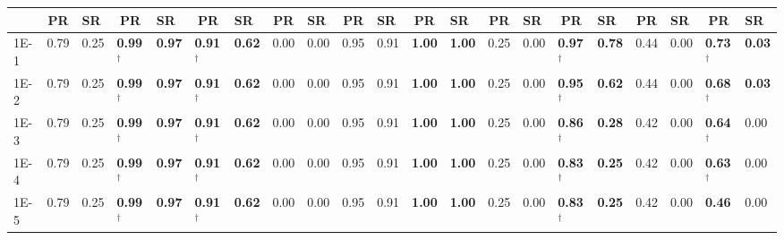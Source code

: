 \begin{table*}[h]
{\begin{tabular}{|p{4.8mm}|p{4.6mm}|p{4.6mm}|p{4.6mm}|p{4.6mm}|p{4.6mm}|p{4.6mm}|p{4.6mm}|p{4.6mm}|p{4.6mm}|p{4.6mm}|p{4.6mm}|p{4.6mm}|p{4.6mm}|p{4.6mm}|p{4.6mm}|p{4.6mm}|p{4.6mm}|p{4.6mm}|p{4.6mm}|p{4.6mm}|}
    \cline{2-21}
     & \multicolumn{1}{c|}{PR} & SR & \multicolumn{1}{c|}{PR} & SR & \multicolumn{1}{c|}{PR} & SR & \multicolumn{1}{c|}{PR} & SR & \multicolumn{1}{c|}{PR} & SR & \multicolumn{1}{c|}{PR} & SR & \multicolumn{1}{c|}{PR} & SR & \multicolumn{1}{c|}{PR} & SR & \multicolumn{1}{c|}{PR} & SR & \multicolumn{1}{c|}{PR} & SR \\
    \hline
    1E-1 & 0.79 & 0.25 & \textcolor{customblue}{\textbf{0.99$^\dagger$}} & \textcolor{customblue}{\textbf{0.97}} & \textcolor{customred}{\textbf{0.91$^\dagger$}} & \textcolor{customred}{\textbf{0.62}} & 0.00 & 0.00 & 0.95 & 0.91 & \textcolor{customblue}{\textbf{1.00}} & \textcolor{customblue}{\textbf{1.00}} & 0.25 & 0.00 & \textcolor{customblue}{\textbf{0.97$^\dagger$}} & \textcolor{customblue}{\textbf{0.78}} & 0.44 & 0.00 & \textcolor{customblue}{\textbf{0.73$^\dagger$}} & \textcolor{customblue}{\textbf{0.03}} \\
    1E-2 & 0.79 & 0.25 & \textcolor{customblue}{\textbf{0.99$^\dagger$}} & \textcolor{customblue}{\textbf{0.97}} & \textcolor{customred}{\textbf{0.91$^\dagger$}} & \textcolor{customred}{\textbf{0.62}} & 0.00 & 0.00 & 0.95 & 0.91 & \textcolor{customblue}{\textbf{1.00}} & \textcolor{customblue}{\textbf{1.00}} & 0.25 & 0.00 & \textcolor{customblue}{\textbf{0.95$^\dagger$}} & \textcolor{customblue}{\textbf{0.62}} & 0.44 & 0.00 & \textcolor{customblue}{\textbf{0.68$^\dagger$}} & \textcolor{customblue}{\textbf{0.03}} \\
    1E-3 & 0.79 & 0.25 & \textcolor{customblue}{\textbf{0.99$^\dagger$}} & \textcolor{customblue}{\textbf{0.97}} & \textcolor{customred}{\textbf{0.91$^\dagger$}} & \textcolor{customred}{\textbf{0.62}} & 0.00 & 0.00 & 0.95 & 0.91 & \textcolor{customblue}{\textbf{1.00}} & \textcolor{customblue}{\textbf{1.00}} & 0.25 & 0.00 & \textcolor{customblue}{\textbf{0.86$^\dagger$}} & \textcolor{customblue}{\textbf{0.28}} & 0.42 & 0.00 & \textcolor{customblue}{\textbf{0.64$^\dagger$}} & 0.00 \\
    1E-4 & 0.79 & 0.25 & \textcolor{customblue}{\textbf{0.99$^\dagger$}} & \textcolor{customblue}{\textbf{0.97}} & \textcolor{customred}{\textbf{0.91$^\dagger$}} & \textcolor{customred}{\textbf{0.62}} & 0.00 & 0.00 & 0.95 & 0.91 & \textcolor{customblue}{\textbf{1.00}} & \textcolor{customblue}{\textbf{1.00}} & 0.25 & 0.00 & \textcolor{customblue}{\textbf{0.83$^\dagger$}} & \textcolor{customblue}{\textbf{0.25}} & 0.42 & 0.00 & \textcolor{customblue}{\textbf{0.63$^\dagger$}} & 0.00 \\
    1E-5 & 0.79 & 0.25 & \textcolor{customblue}{\textbf{0.99$^\dagger$}} & \textcolor{customblue}{\textbf{0.97}} & \textcolor{customred}{\textbf{0.91$^\dagger$}} & \textcolor{customred}{\textbf{0.62}} & 0.00 & 0.00 & 0.95 & 0.91 & \textcolor{customblue}{\textbf{1.00}} & \textcolor{customblue}{\textbf{1.00}} & 0.25 & 0.00 & \textcolor{customblue}{\textbf{0.83$^\dagger$}} & \textcolor{customblue}{\textbf{0.25}} & 0.42 & 0.00 & \textcolor{customblue}{\textbf{0.46}} & 0.00 \\

\end{tabular}}
\end{table*}
